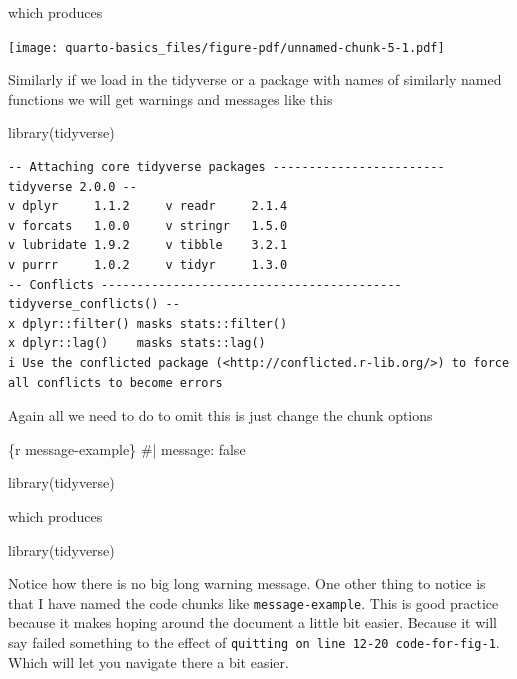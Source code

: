 \documentclass[
  letterpaper,
  DIV=11,
  numbers=noendperiod,
  oneside]{scrreprt}
\newenvironment{Shaded}{\begin{snugshade}}{\end{snugshade}}
\newcommand{\CommentTok}[1]{\textcolor[rgb]{0.37,0.37,0.37}{#1}}
\newcommand{\FunctionTok}[1]{\textcolor[rgb]{0.28,0.35,0.67}{#1}}
\newcommand{\InformationTok}[1]{\textcolor[rgb]{0.37,0.37,0.37}{#1}}
\newcommand{\NormalTok}[1]{\textcolor[rgb]{0.00,0.23,0.31}{#1}}
\begin{document}
which produces

\texttt{[image: quarto-basics\_files/figure-pdf/unnamed-chunk-5-1.pdf]}

Similarly if we load in the tidyverse or a package with names of
similarly named functions we will get warnings and messages like this

\begin{Shaded}
\begin{Highlighting}[]
\FunctionTok{library}\NormalTok{(tidyverse)}
\end{Highlighting}
\end{Shaded}

\begin{verbatim}
-- Attaching core tidyverse packages ------------------------ tidyverse 2.0.0 --
v dplyr     1.1.2     v readr     2.1.4
v forcats   1.0.0     v stringr   1.5.0
v lubridate 1.9.2     v tibble    3.2.1
v purrr     1.0.2     v tidyr     1.3.0
-- Conflicts ------------------------------------------ tidyverse_conflicts() --
x dplyr::filter() masks stats::filter()
x dplyr::lag()    masks stats::lag()
i Use the conflicted package (<http://conflicted.r-lib.org/>) to force all conflicts to become errors
\end{verbatim}

Again all we need to do to omit this is just change the chunk options

\begin{Shaded}
\begin{Highlighting}[]
\InformationTok{\textasciigrave{}\textasciigrave{}\textasciigrave{}\{r message{-}example\}}
\CommentTok{\#| message: false}

\FunctionTok{library}\NormalTok{(tidyverse)}

\InformationTok{\textasciigrave{}\textasciigrave{}\textasciigrave{}}
\end{Highlighting}
\end{Shaded}

which produces

\begin{Shaded}
\begin{Highlighting}[]
\FunctionTok{library}\NormalTok{(tidyverse)}
\end{Highlighting}
\end{Shaded}

Notice how there is no big long warning message. One other thing to
notice is that I have named the code chunks like
\texttt{message-example}. This is good practice because it makes hoping
around the document a little bit easier. Because it will say failed
something to the effect of
\texttt{quitting\ on\ line\ 12-20\ code-for-fig-1}. Which will let you
navigate there a bit easier.
\end{document}

